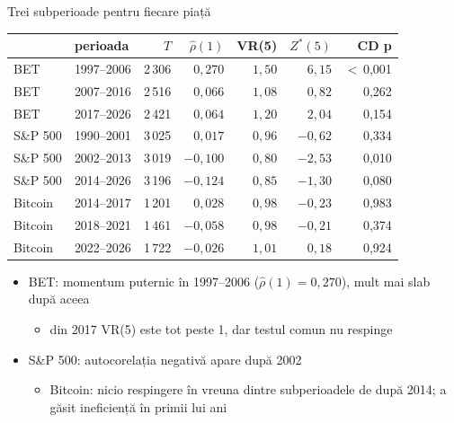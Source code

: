 \begin{frame}{Trei subperioade pentru fiecare piață}
\itemsize{\footnotesize}
\begin{center}
\scriptsize
\begin{tabular}{llrrrrr}
\toprule
& perioada & $T$ & $\hat\rho(1)$ & VR(5) & $Z^*(5)$ & CD p \\
\midrule
BET & 1997--2006 & 2\,306 & ${0{,}270}$ & $1{,}50$ & ${6{,}15}$ & $<$\,0{,}001 \\
BET & 2007--2016 & 2\,516 & ${0{,}066}$ & $1{,}08$ & ${0{,}82}$ & 0{,}262 \\
BET & 2017--2026 & 2\,421 & ${0{,}064}$ & $1{,}20$ & ${2{,}04}$ & 0{,}154 \\
S\&P 500 & 1990--2001 & 3\,025 & ${0{,}017}$ & $0{,}96$ & ${-0{,}62}$ & 0{,}334 \\
S\&P 500 & 2002--2013 & 3\,019 & ${-0{,}100}$ & $0{,}80$ & ${-2{,}53}$ & 0{,}010 \\
S\&P 500 & 2014--2026 & 3\,196 & ${-0{,}124}$ & $0{,}85$ & ${-1{,}30}$ & 0{,}080 \\
Bitcoin & 2014--2017 & 1\,201 & ${0{,}028}$ & $0{,}98$ & ${-0{,}23}$ & 0{,}983 \\
Bitcoin & 2018--2021 & 1\,461 & ${-0{,}058}$ & $0{,}98$ & ${-0{,}21}$ & 0{,}374 \\
Bitcoin & 2022--2026 & 1\,722 & ${-0{,}026}$ & $1{,}01$ & ${0{,}18}$ & 0{,}924 \\
\bottomrule
\end{tabular}
\end{center}
\begin{itemize}
    \item BET: momentum puternic în 1997--2006 ($\hat\rho(1) = 0{,}270$), mult mai slab după aceea
    \begin{itemize}
        \item din 2017 VR(5) este tot peste 1, dar testul comun nu respinge
    \end{itemize}
    \item S\&P 500: autocorelația negativă apare după 2002
    \begin{itemize}
        \item Bitcoin: nicio respingere în vreuna dintre subperioadele de după 2014;  a găsit ineficiență în primii lui ani
    \end{itemize}
\end{itemize}
\end{frame}

